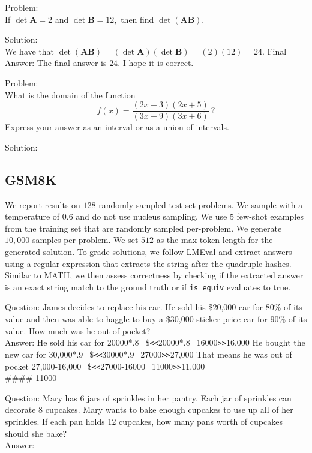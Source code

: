 \documentclass[11pt]{article}
\begin{document}
\begin{tcolorbox}[
    colback=gray!5,
    colframe=gray!75,
    title=Few-Shot Example,
    fonttitle=\bfseries
]
Problem:\\
If $\det \mathbf{A} = 2$ and $\det \mathbf{B} = 12,$ then find $\det (\mathbf{A} \mathbf{B}).$

Solution:\\
We have that $\det (\mathbf{A} \mathbf{B}) = (\det \mathbf{A})(\det \mathbf{B}) = (2)(12) = \boxed{24}.$
Final Answer: The final answer is $24$. I hope it is correct.
\end{tcolorbox}

\begin{tcolorbox}[
    colback=gray!5,
    colframe=gray!75,
    title=Example Prompt,
    fonttitle=\bfseries
]
Problem:\\
What is the domain of the function $$f(x) = \frac{(2x-3)(2x+5)}{(3x-9)(3x+6)}~?$$ Express your answer as an interval or as a union of intervals.

Solution:
\end{tcolorbox}

\subsection{GSM8K} We report results on $128$ randomly sampled test-set problems. We sample with a temperature of $0.6$ and do not use nucleus sampling. We use $5$ few-shot examples from the training set that are randomly sampled per-problem. We generate $10,000$ samples per problem. We set $512$ as the max token length for the generated solution. To grade solutions, we follow LMEval \cite{eval-harness} and extract answers using a regular expression that extracts the string after the quadruple hashes. Similar to MATH, we then assess correctness by checking if the extracted answer is an exact string match to the ground truth or if \verb|is_equiv| evaluates to true. 


\begin{tcolorbox}[
    colback=gray!5,
    colframe=gray!75,
    title=Few-Shot Example,
    fonttitle=\bfseries
]
Question: James decides to replace his car.  He sold his \$20,000 car for 80\% of its value and then was able to haggle to buy a \$30,000 sticker price car for 90\% of its value.  How much was he out of pocket?\\
Answer: He sold his car for 20000*.8=\$\verb|<<|20000*.8=16000\verb|>>|16,000
He bought the new car for 30,000*.9=\$\verb|<<|30000*.9=27000\verb|>>|27,000
That means he was out of pocket 27,000-16,000=\$\verb|<<|27000-16000=11000\verb|>>|11,000\\
\#\#\#\# 11000
\end{tcolorbox}
\begin{tcolorbox}[
    colback=gray!5,
    colframe=gray!75,
    title=Example Prompt,
    fonttitle=\bfseries
]
Question: Mary has 6 jars of sprinkles in her pantry. Each jar of sprinkles can decorate 8 cupcakes. Mary wants to bake enough cupcakes to use up all of her sprinkles. If each pan holds 12 cupcakes, how many pans worth of cupcakes should she bake?\\
Answer:
\end{tcolorbox}
\end{document}
